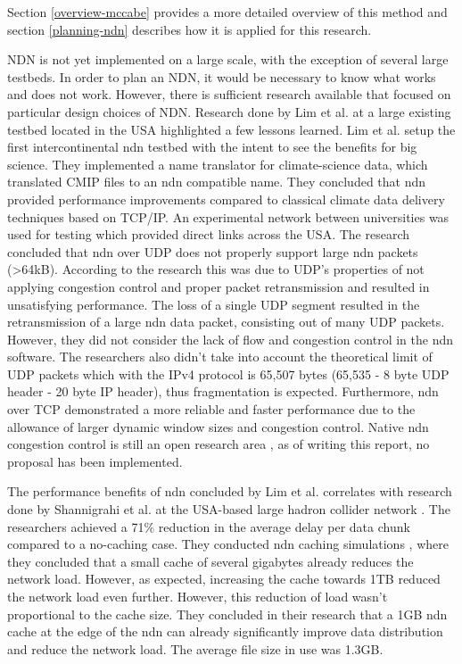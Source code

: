 
Section \ref{overview-mccabe} provides a more detailed overview of this method and section \ref{planning-ndn} describes how it is applied for this research.

NDN is not yet implemented on a large scale, with the exception of several large testbeds. In order to plan an NDN, it would be necessary to know what works and does not work. However, there is sufficient research available that focused on particular design choices of NDN. Research done by Lim et al. \cite{lim2018ndn} at a large existing testbed located in the USA \cite{ndn-testbed-status} highlighted a few lessons learned. Lim et al. setup the first intercontinental \gls{ndn} testbed with the intent to see the benefits for big science. They implemented a name translator for climate-science data, which translated CMIP files to an \gls{ndn} compatible name. They concluded that \gls{ndn} provided performance improvements compared to classical climate data delivery techniques based on TCP/IP. An experimental network between universities was used for testing which provided direct links across the USA. The research concluded that \gls{ndn} over UDP does not properly support large \gls{ndn} packets (\textgreater 64kB). According to the research this was due to UDP's properties of not applying congestion control and proper packet retransmission and resulted in unsatisfying performance. The loss of a single UDP segment resulted in the retransmission of a large \gls{ndn} data packet, consisting out of many UDP packets. However, they did not consider the lack of flow and congestion control in the \gls{ndn} software. The researchers also didn't take into account the theoretical limit of UDP packets which with the IPv4 protocol is 65,507 bytes (65,535 - 8 byte UDP header - 20 byte IP header), thus fragmentation is expected. Furthermore, \gls{ndn} over TCP demonstrated a more reliable and faster performance due to the allowance of larger dynamic window sizes and congestion control. Native \gls{ndn} congestion control is still an open research area \cite{ren2016congestion}, as of writing this report, no proposal has been implemented.

The performance benefits of \gls{ndn} concluded by Lim et al. correlates with research done by Shannigrahi et al. at the USA-based large hadron collider network \cite{shannigrahi2015named}. The researchers achieved a 71\% reduction in the average delay per data chunk compared to a no-caching case. They conducted \gls{ndn} caching simulations \cite{shannigrahi2017request}, where they concluded that a small cache of several gigabytes already reduces the network load. However, as expected, increasing the cache towards 1TB reduced the network load even further. However, this reduction of load wasn't proportional to the cache size. They concluded in their research that a 1GB \gls{ndn} cache at the edge of the \gls{ndn} can already significantly improve data distribution and reduce the network load. The average file size in use was 1.3GB.

